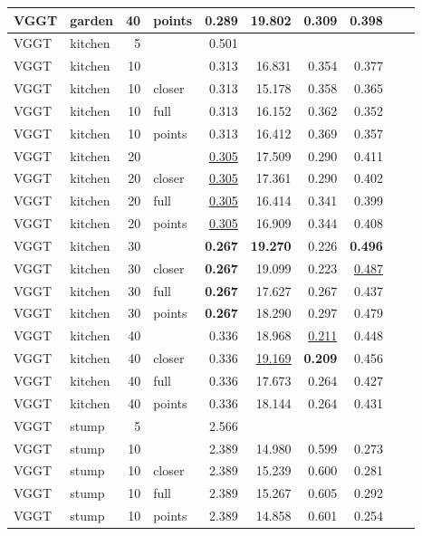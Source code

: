 \begin{table}[H]
\begin{tabular}{llrlrrrrrr}
VGGT & garden & 40 & points & 0.289 & 19.802 & 0.309 & 0.398 &  &  \\
\midrule
VGGT & kitchen & 5 &  & 0.501 &  &  &  &  &  \\
VGGT & kitchen & 10 &  & 0.313 & 16.831 & 0.354 & 0.377 &  &  \\
VGGT & kitchen & 10 & closer & 0.313 & 15.178 & 0.358 & 0.365 &  &  \\
VGGT & kitchen & 10 & full & 0.313 & 16.152 & 0.362 & 0.352 &  &  \\
VGGT & kitchen & 10 & points & 0.313 & 16.412 & 0.369 & 0.357 &  &  \\
VGGT & kitchen & 20 &  & \underline{0.305} & 17.509 & 0.290 & 0.411 &  &  \\
VGGT & kitchen & 20 & closer & \underline{0.305} & 17.361 & 0.290 & 0.402 &  &  \\
VGGT & kitchen & 20 & full & \underline{0.305} & 16.414 & 0.341 & 0.399 &  &  \\
VGGT & kitchen & 20 & points & \underline{0.305} & 16.909 & 0.344 & 0.408 &  &  \\
VGGT & kitchen & 30 &  & \textbf{0.267} & \textbf{19.270} & 0.226 & \textbf{0.496} &  &  \\
VGGT & kitchen & 30 & closer & \textbf{0.267} & 19.099 & 0.223 & \underline{0.487} &  &  \\
VGGT & kitchen & 30 & full & \textbf{0.267} & 17.627 & 0.267 & 0.437 &  &  \\
VGGT & kitchen & 30 & points & \textbf{0.267} & 18.290 & 0.297 & 0.479 &  &  \\
VGGT & kitchen & 40 &  & 0.336 & 18.968 & \underline{0.211} & 0.448 &  &  \\
VGGT & kitchen & 40 & closer & 0.336 & \underline{19.169} & \textbf{0.209} & 0.456 &  &  \\
VGGT & kitchen & 40 & full & 0.336 & 17.673 & 0.264 & 0.427 &  &  \\
VGGT & kitchen & 40 & points & 0.336 & 18.144 & 0.264 & 0.431 &  &  \\
\midrule
VGGT & stump & 5 &  & 2.566 &  &  &  &  &  \\
VGGT & stump & 10 &  & 2.389 & 14.980 & 0.599 & 0.273 &  &  \\
VGGT & stump & 10 & closer & 2.389 & 15.239 & 0.600 & 0.281 &  &  \\
VGGT & stump & 10 & full & 2.389 & 15.267 & 0.605 & 0.292 &  &  \\
VGGT & stump & 10 & points & 2.389 & 14.858 & 0.601 & 0.254 &  &  \\

\end{tabular}
\end{table}
